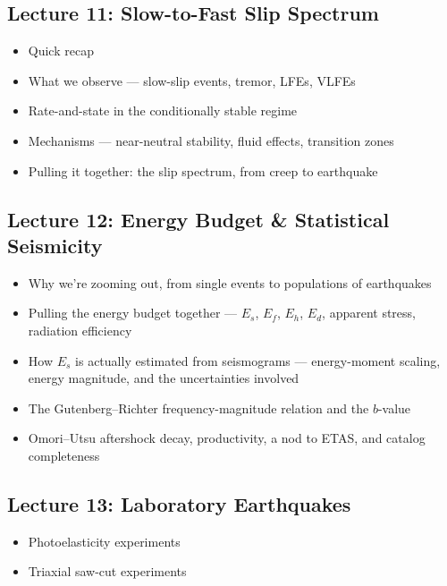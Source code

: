\subsection*{Lecture 11: Slow-to-Fast Slip Spectrum}
\begin{itemize}
    \item Quick recap
    \item What we observe --- slow-slip events, tremor, LFEs, VLFEs
    \item Rate-and-state in the conditionally stable regime
    
    \item Mechanisms --- near-neutral stability, fluid effects, transition zones
    \item Pulling it together: the slip spectrum, from creep to earthquake
    
\end{itemize}

\subsection*{Lecture 12: Energy Budget \& Statistical Seismicity}
\begin{itemize}
    \item Why we're zooming out, from single events to populations of earthquakes
    \item Pulling the energy budget together --- $E_s$, $E_f$, $E_h$, $E_d$, apparent stress, radiation efficiency
    \item How $E_s$ is actually estimated from seismograms --- energy-moment scaling, energy magnitude, and the uncertainties involved
    
    \item The Gutenberg--Richter frequency-magnitude relation and the $b$-value
    \item Omori--Utsu aftershock decay, productivity, a nod to ETAS, and catalog completeness
    
\end{itemize}

\subsection*{Lecture 13: Laboratory Earthquakes}
\begin{itemize}
    \item Photoelasticity experiments
    
    \item Triaxial saw-cut experiments
    
\end{itemize}